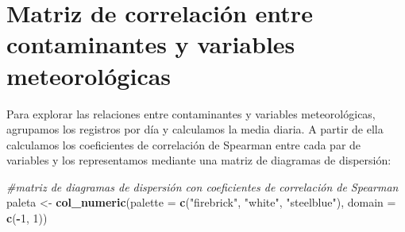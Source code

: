 \documentclass[notspecified,article,submit,oneauthor,pdftex]{Definitions/mdpi}
\newenvironment{Shaded}{\begin{snugshade}}{\end{snugshade}}
\newcommand{\AttributeTok}[1]{\textcolor[rgb]{0.13,0.29,0.53}{#1}}
\newcommand{\CommentTok}[1]{\textcolor[rgb]{0.56,0.35,0.01}{\textit{#1}}}
\newcommand{\DecValTok}[1]{\textcolor[rgb]{0.00,0.00,0.81}{#1}}
\newcommand{\FunctionTok}[1]{\textcolor[rgb]{0.13,0.29,0.53}{\textbf{#1}}}
\newcommand{\NormalTok}[1]{#1}
\newcommand{\OtherTok}[1]{\textcolor[rgb]{0.56,0.35,0.01}{#1}}
\newcommand{\SpecialCharTok}[1]{\textcolor[rgb]{0.81,0.36,0.00}{\textbf{#1}}}
\newcommand{\StringTok}[1]{\textcolor[rgb]{0.31,0.60,0.02}{#1}}
\begin{document}
\section{Matriz de correlación entre contaminantes y variables
meteorológicas}\label{matriz-de-correlaciuxf3n-entre-contaminantes-y-variables-meteoroluxf3gicas}

Para explorar las relaciones entre contaminantes y variables
meteorológicas, agrupamos los registros por día y calculamos la media
diaria. A partir de ella calculamos los coeficientes de correlación de
Spearman entre cada par de variables y los representamos mediante una
matriz de diagramas de dispersión:

\begin{Shaded}
\begin{Highlighting}[]
\CommentTok{\#matriz de diagramas de dispersión con coeficientes de correlación de Spearman}
\NormalTok{paleta }\OtherTok{\textless{}{-}} \FunctionTok{col\_numeric}\NormalTok{(}\AttributeTok{palette =} \FunctionTok{c}\NormalTok{(}\StringTok{"firebrick"}\NormalTok{, }\StringTok{"white"}\NormalTok{, }\StringTok{"steelblue"}\NormalTok{), }\AttributeTok{domain =} \FunctionTok{c}\NormalTok{(}\SpecialCharTok{{-}}\DecValTok{1}\NormalTok{, }\DecValTok{1}\NormalTok{))}


\end{Highlighting}
\end{Shaded}
\end{document}
